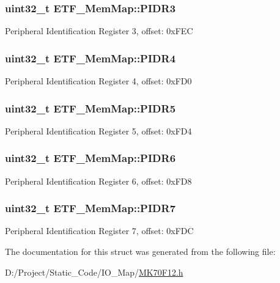 \subsubsection[{P\+I\+D\+R3}]{\setlength{\rightskip}{0pt plus 5cm}uint32\+\_\+t E\+T\+F\+\_\+\+Mem\+Map\+::\+P\+I\+D\+R3}\label{struct_e_t_f___mem_map_a1132bf279f207a39e89f2fab3d384308}
Peripheral Identification Register 3, offset\+: 0x\+F\+E\+C \hypertarget{struct_e_t_f___mem_map_a955a81d9c5e73e129ca965fa226bfde8}{}
\subsubsection[{P\+I\+D\+R4}]{\setlength{\rightskip}{0pt plus 5cm}uint32\+\_\+t E\+T\+F\+\_\+\+Mem\+Map\+::\+P\+I\+D\+R4}\label{struct_e_t_f___mem_map_a955a81d9c5e73e129ca965fa226bfde8}
Peripheral Identification Register 4, offset\+: 0x\+F\+D0 \hypertarget{struct_e_t_f___mem_map_a3054ae260a217f950e2c7793ff27855d}{}
\subsubsection[{P\+I\+D\+R5}]{\setlength{\rightskip}{0pt plus 5cm}uint32\+\_\+t E\+T\+F\+\_\+\+Mem\+Map\+::\+P\+I\+D\+R5}\label{struct_e_t_f___mem_map_a3054ae260a217f950e2c7793ff27855d}
Peripheral Identification Register 5, offset\+: 0x\+F\+D4 \hypertarget{struct_e_t_f___mem_map_a3448111767c72273ead546c08f49047b}{}
\subsubsection[{P\+I\+D\+R6}]{\setlength{\rightskip}{0pt plus 5cm}uint32\+\_\+t E\+T\+F\+\_\+\+Mem\+Map\+::\+P\+I\+D\+R6}\label{struct_e_t_f___mem_map_a3448111767c72273ead546c08f49047b}
Peripheral Identification Register 6, offset\+: 0x\+F\+D8 \hypertarget{struct_e_t_f___mem_map_a53393d8ce48a43bed1d5568561776a5c}{}
\subsubsection[{P\+I\+D\+R7}]{\setlength{\rightskip}{0pt plus 5cm}uint32\+\_\+t E\+T\+F\+\_\+\+Mem\+Map\+::\+P\+I\+D\+R7}\label{struct_e_t_f___mem_map_a53393d8ce48a43bed1d5568561776a5c}
Peripheral Identification Register 7, offset\+: 0x\+F\+D\+C 

The documentation for this struct was generated from the following file\+:\begin{DoxyCompactItemize}
\item 
D\+:/\+Project/\+Static\+\_\+\+Code/\+I\+O\+\_\+\+Map/\hyperlink{_m_k70_f12_8h}{M\+K70\+F12.\+h}\end{DoxyCompactItemize}
